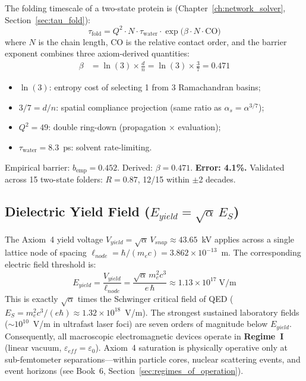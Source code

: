 The folding timescale of a two-state protein is (Chapter~\ref{ch:network_solver},
Section~\ref{sec:tau_fold}):
\begin{equation}
    \tau_\text{fold} = Q^2 \cdot N \cdot \tau_\text{water} \cdot \exp\!\bigl(\beta \cdot N \cdot \text{CO}\bigr)
\end{equation}
where $N$ is the chain length, CO is the relative contact order, and the barrier exponent combines three axiom-derived quantities:
\begin{align}
    \beta &= \ln(3) \times \frac{d}{n} = \ln(3) \times \frac{3}{7} = 0.471
\end{align}
\begin{itemize}
    \item $\ln(3)$: entropy cost of selecting 1 from 3 Ramachandran basins;
    \item $3/7 = d/n$: spatial compliance projection (same ratio as $\alpha_s = \alpha^{3/7}$);
    \item $Q^2 = 49$: double ring-down (propagation $\times$ evaluation);
    \item $\tau_\text{water} = 8.3$~ps: solvent rate-limiting.
\end{itemize}
Empirical barrier: $b_\text{emp} = 0.452$.  Derived: $\beta = 0.471$.  \textbf{Error: 4.1\%.}
Validated across 15 two-state folders: $R = 0.87$, 12/15 within $\pm$2 decades.

\subsection{Dielectric Yield Field ($E_{yield} = \sqrt{\alpha}\, E_S$)}

The Axiom~4 yield voltage $V_{yield} = \sqrt{\alpha}\, V_{snap} \approx 43.65$~kV applies across a single lattice node of spacing $\ell_{node} = \hbar/(m_e c) = 3.862 \times 10^{-13}$~m. The corresponding electric field threshold is:
\begin{equation}
    E_{yield} = \frac{V_{yield}}{\ell_{node}} = \frac{\sqrt{\alpha}\, m_e^2 c^3}{e\, \hbar} \approx 1.13 \times 10^{17}\;\text{V/m}
\end{equation}
This is exactly $\sqrt{\alpha}$ times the Schwinger critical field of QED ($E_S = m_e^2 c^3 / (e\hbar) \approx 1.32 \times 10^{18}$~V/m). The strongest sustained laboratory fields ($\sim 10^{10}$~V/m in ultrafast laser foci) are seven orders of magnitude below $E_{yield}$. Consequently, all macroscopic electromagnetic devices operate in \textbf{Regime~I} (linear vacuum, $\varepsilon_{eff} = \varepsilon_0$). Axiom~4 saturation is physically operative only at sub-femtometer separations---within particle cores, nuclear scattering events, and event horizons (see Book~6, Section~\ref{sec:regimes_of_operation}).

